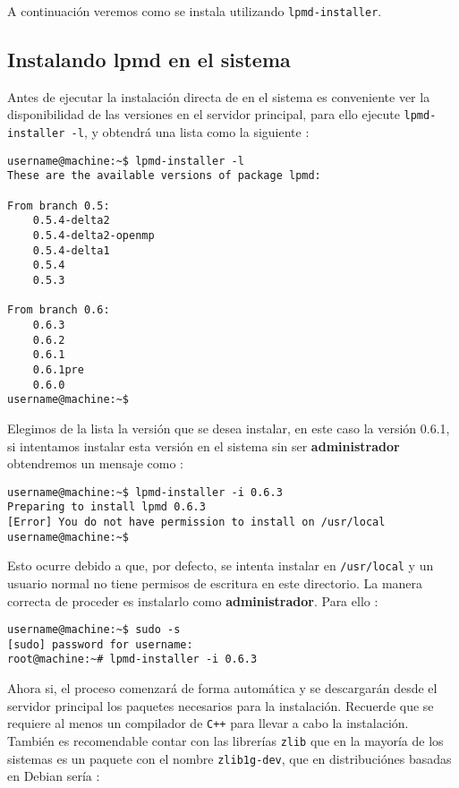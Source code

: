 A continuaci\'on veremos como se instala {\lpmd} utilizando \verb|lpmd-installer|.

\subsection{Instalando lpmd en el sistema}

Antes de ejecutar la instalaci\'on directa de {\lpmd} en el sistema es conveniente ver la disponibilidad de las versiones en el servidor principal, para ello ejecute \verb|lpmd-installer -l|, y obtendr\'a una lista como la siguiente :

\begin{verbatim}
username@machine:~$ lpmd-installer -l
These are the available versions of package lpmd:

From branch 0.5: 
    0.5.4-delta2
    0.5.4-delta2-openmp
    0.5.4-delta1
    0.5.4
    0.5.3

From branch 0.6:
    0.6.3 
    0.6.2
    0.6.1
    0.6.1pre
    0.6.0
username@machine:~$
\end{verbatim}

Elegimos de la lista la versi\'on que se desea instalar, en este caso la versi\'on 0.6.1, si intentamos instalar esta versi\'on en el sistema sin ser \textbf{administrador} obtendremos un mensaje como  :

\begin{verbatim}
username@machine:~$ lpmd-installer -i 0.6.3
Preparing to install lpmd 0.6.3
[Error] You do not have permission to install on /usr/local
username@machine:~$
\end{verbatim}

Esto ocurre debido a que, por defecto, {\lpmd} se intenta instalar en \verb|/usr/local| y un usuario normal no tiene permisos de escritura en este directorio. La manera correcta de proceder es instalarlo como \textbf{administrador}. Para ello :

\begin{verbatim}
username@machine:~$ sudo -s
[sudo] password for username: 
root@machine:~# lpmd-installer -i 0.6.3
\end{verbatim}

Ahora si, el proceso comenzar\'a de forma autom\'atica y se descargar\'an desde el servidor principal los paquetes necesarios para la instalaci\'on. Recuerde que se requiere al menos un compilador de \verb|C++| para llevar a cabo la instalaci\'on. Tambi\'en es recomendable contar con las librer\'ias \verb|zlib| que en la mayor\'ia de los sistemas es un paquete con el nombre \verb|zlib1g-dev|, que en distribuci\'ones basadas en Debian ser\'ia :

